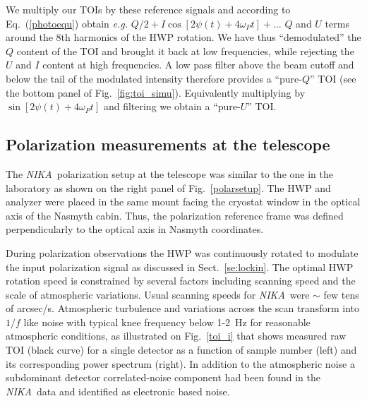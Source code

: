 \documentclass[twocolumn, traditabstract]{aa}
\newcommand{\nika}{{\it NIKA}}
\begin{document}
We multiply our TOIs by these reference signals and according
to Eq.~(\ref{photoequ}) obtain {\it e.g.} $Q/2 + I\cos[2\psi(t)+4\omega_Pt] +...$ $Q$
and $U$ terms around the 8th harmonics of the HWP rotation. We have thus
``demodulated'' the $Q$ content of the TOI and brought it back at low
frequencies, while rejecting the $U$ and $I$ content at high frequencies. A low
pass filter above the beam cutoff and below the tail of the modulated intensity
therefore provides a ``pure-$Q$''  TOI (see the bottom panel of
Fig.~\ref{fig:toi_simu}). Equivalently multiplying by
$\sin\left[2\psi(t)+4\omega_Pt\right]$ and filtering we obtain a ``pure-$U$'' TOI.

\subsection{Polarization measurements at the telescope}
\label{polsetup}
The \nika\ polarization setup at the telescope was similar to the one in the
laboratory as shown on the right panel of Fig.~\ref{polarsetup}.  The HWP and
analyzer were placed in the same mount facing the cryostat window in the optical
axis of the Nasmyth cabin. Thus, the polarization reference frame was defined
perpendicularly to the optical axis in Nasmyth coordinates. 

During polarization observations the HWP was continuously rotated to modulate
the input polarization signal as discussed in Sect.~\ref{se:lockin}. The optimal
HWP rotation speed is constrained by several factors including scanning speed
and the scale of atmospheric variations. Usual scanning speeds for \nika\ were
$\sim$ few tens of arcsec/s. Atmospheric turbulence and variations
across the scan transform into $1/f$ like noise with typical knee frequency
below 1-2~Hz for reasonable atmospheric conditions, as illustrated on
Fig.~\ref{toi_i} that shows measured raw TOI (black curve) for a single detector as a
function of sample number (left) and its corresponding power spectrum
(right). In addition to the atmospheric noise a subdominant detector
correlated-noise component had been found in the \nika\ data and identified as
electronic based noise. 
\end{document}
